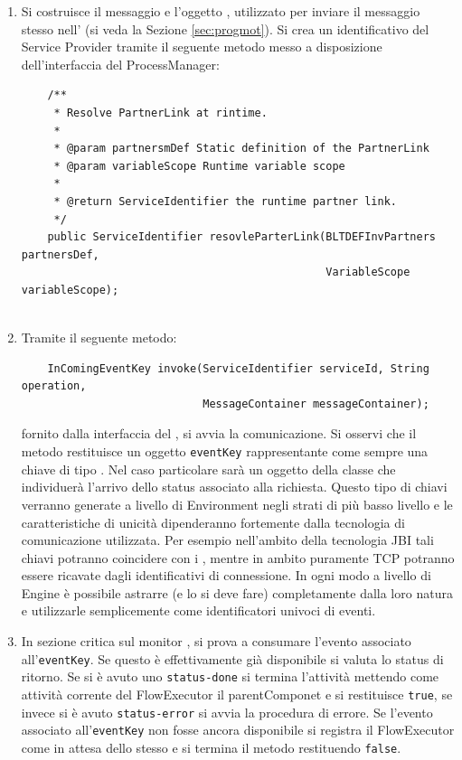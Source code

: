 \begin{enumerate}
  \item Si costruisce il messaggio e l'oggetto , 
  utilizzato per inviare il messaggio stesso nell' (si
  veda la Sezione \ref{sec:progmot}). Si crea un identificativo del Service Provider
  tramite il seguente metodo messo a disposizione dell'interfaccia del ProcessManager:
  \begin{lstlisting}
  	/**
     * Resolve PartnerLink at rintime.
     * 
     * @param partnersmDef Static definition of the PartnerLink
     * @param variableScope Runtime variable scope
     * 
     * @return ServiceIdentifier the runtime partner link.
     */
    public ServiceIdentifier resovleParterLink(BLTDEFInvPartners partnersDef, 
											   VariableScope variableScope);
    
  \end{lstlisting}  
  
  \item Tramite il seguente metodo: 
  \begin{lstlisting}
  	InComingEventKey invoke(ServiceIdentifier serviceId, String operation, 
							MessageContainer messageContainer);
  \end{lstlisting}
  fornito dalla interfaccia del , si avvia la
  comunicazione. Si osservi che il metodo restituisce un oggetto
  \texttt{eventKey} rappresentante come sempre una chiave di tipo . Nel caso particolare sarà un oggetto della classe
   che individuerà l'arrivo dello status
  associato alla richiesta. Questo tipo di chiavi verranno generate a livello di
  Environment negli strati di più basso livello e le caratteristiche di unicità dipenderanno fortemente dalla tecnologia di comunicazione
 utilizzata. Per esempio nell'ambito della tecnologia JBI \cite{JBI} tali chiavi
 potranno coincidere con i , mentre in ambito puramente
 TCP potranno essere ricavate dagli identificativi di connessione. In ogni modo a livello di Engine
 \`e possibile astrarre (e lo si deve fare) completamente dalla loro natura e
 utilizzarle semplicemente come identificatori univoci di eventi.
  
  \item In sezione critica sul monitor , si
  prova a consumare l'evento associato all'\texttt{eventKey}. Se questo \`e
  effettivamente già disponibile si valuta lo status di ritorno. Se si \`e
  avuto uno \texttt{status-done} si termina l'attività mettendo come
  attività corrente del FlowExecutor il parentComponet e si restituisce
  \texttt{true}, se invece si \`e avuto \texttt{status-error} si avvia la
  procedura di errore. Se l'evento associato all'\texttt{eventKey} non fosse
  ancora disponibile si registra il FlowExecutor come in attesa dello stesso e
  si termina il metodo  restituendo \texttt{false}.
  

\end{enumerate}
